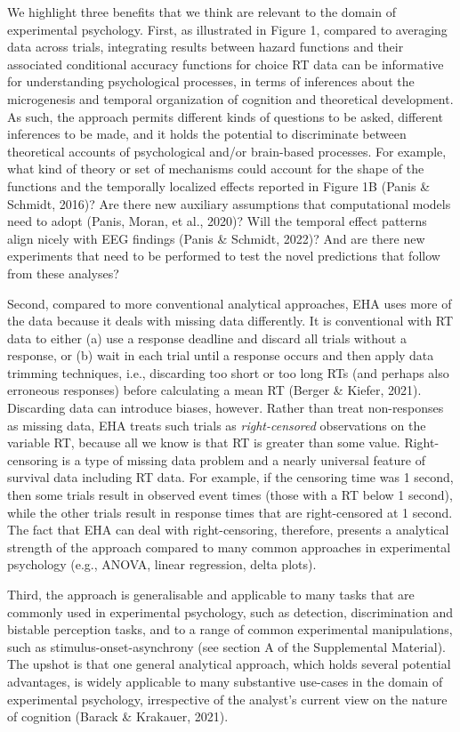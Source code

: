\documentclass[
  man, donotrepeattitle,floatsintext]{apa6}
\begin{document}
We highlight three benefits that we think are relevant to the domain of experimental psychology.
First, as illustrated in Figure 1, compared to averaging data across trials, integrating results between hazard functions and their associated conditional accuracy functions for choice RT data can be informative for understanding psychological processes, in terms of inferences about the microgenesis and temporal organization of cognition and theoretical development.
As such, the approach permits different kinds of questions to be asked, different inferences to be made, and it holds the potential to discriminate between theoretical accounts of psychological and/or brain-based processes.
For example, what kind of theory or set of mechanisms could account for the shape of the functions and the temporally localized effects reported in Figure 1B (Panis \& Schmidt, 2016)?
Are there new auxiliary assumptions that computational models need to adopt (Panis, Moran, et al., 2020)?
Will the temporal effect patterns align nicely with EEG findings (Panis \& Schmidt, 2022)?
And are there new experiments that need to be performed to test the novel predictions that follow from these analyses?

Second, compared to more conventional analytical approaches, EHA uses more of the data because it deals with missing data differently.
It is conventional with RT data to either (a) use a response deadline and discard all trials without a response, or (b) wait in each trial until a response occurs and then apply data trimming techniques, i.e., discarding too short or too long RTs (and perhaps also erroneous responses) before calculating a mean RT (Berger \& Kiefer, 2021).
Discarding data can introduce biases, however.
Rather than treat non-responses as missing data, EHA treats such trials as \emph{right-censored} observations on the variable RT, because all we know is that RT is greater than some value.
Right-censoring is a type of missing data problem and a nearly universal feature of survival data including RT data.
For example, if the censoring time was 1 second, then some trials result in observed event times (those with a RT below 1 second), while the other trials result in response times that are right-censored at 1 second.
The fact that EHA can deal with right-censoring, therefore, presents a analytical strength of the approach compared to many common approaches in experimental psychology (e.g., ANOVA, linear regression, delta plots).

Third, the approach is generalisable and applicable to many tasks that are commonly used in experimental psychology, such as detection, discrimination and bistable perception tasks, and to a range of common experimental manipulations, such as stimulus-onset-asynchrony (see section A of the Supplemental Material).
The upshot is that one general analytical approach, which holds several potential advantages, is widely applicable to many substantive use-cases in the domain of experimental psychology, irrespective of the analyst's current view on the nature of cognition (Barack \& Krakauer, 2021).
\end{document}
